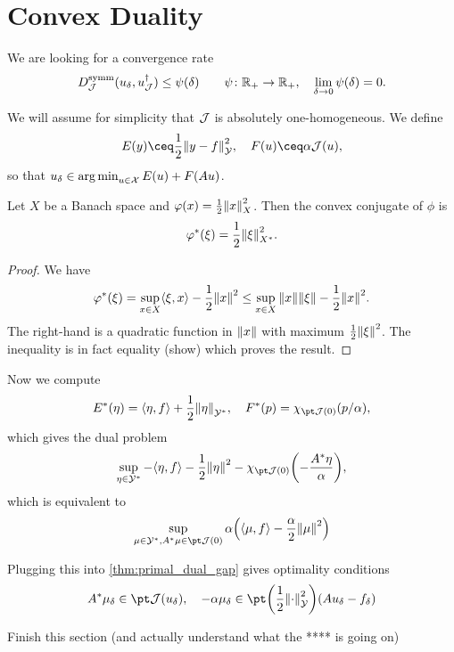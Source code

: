 \section{Convex Duality}
We are looking for a convergence rate
\[
D_\mathcal J^\mathrm{symm}(u_\delta, u_\mathcal J^\dagger) \leq \psi(\delta) \qquad \psi \colon \mathbb R_+ \to \mathbb R_+, \quad \lim_{\delta\to0}\psi(\delta) = 0. 
\]

We will assume for simplicity that $\mathcal J$ is absolutely one-homogeneous.  We define
\[
E(y) \ceq \frac12 \norm{y - f}_\YY^2, \quad F(u) \ceq \alpha \JJ(u), 
\]
so that $u_\delta \in \operatorname*{arg\,min}_{u \in \mathcal X} E(u) + F(Au)$. 

\begin{lemma}
	Let $X$ be a Banach space and $\varphi(x) = \frac12\norm{x}_X^2$. Then the convex conjugate of $\phi$ is
	\[
	\varphi^*(\xi) = \frac12 \norm{\xi}_{X^*}^2. 
	\]
\end{lemma}

\begin{proof}
	We have
	\[
	\varphi^*(\xi) = \sup_{x \in X} \langle\xi, x\rangle - \frac12 \norm{x}^2 \leq \sup_{x \in X} \norm{x} \norm{\xi} - \frac12 \norm{x}^2.
	\]
	The right-hand is a quadratic function in $\norm{x}$ with maximum $\frac12\norm{\xi}^2$. The inequality is in fact equality (\TODO show) which proves the result. 
\end{proof}

Now we compute
\[
E^*(\eta) = \ang{\eta, f} + \frac12 \norm{\eta}_{\YY^*}, \quad F^*(p) = \chi_{\pt \JJ(0)} (p/\alpha), 
\]
which gives the dual problem
\[
\sup_{\eta \in \YY^*} - \ang{\eta, f} - \frac12\norm{\eta}^2 - \chi_{\pt \JJ(0)} \qty(-\frac{A^*\eta}{\alpha}),
\]
which is equivalent to
\[
\sup_{\mu \in \YY^*, A^*\mu \in \pt \JJ(0)} \alpha \qty(\ang{\mu, f} - \frac\alpha2 \norm{\mu}^2)
\]

Plugging this into \cref{thm:primal_dual_gap} gives optimality conditions
\[
A^*\mu_\delta \in \pt \JJ(u_\delta), \quad - \alpha\mu_\delta \in \pt\qty(\frac12 \norm{\cdot}_\YY^2)(Au_\delta - f_\delta)
\]

\TODO Finish this section (and actually understand what the **** is going on)